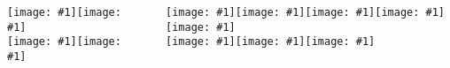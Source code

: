 \documentclass[final,table,14pt,aspectratio=141]{beamer}
\newcommand{\figheight}{.05\textheight}
\newcommand{\putlogo}[1]{\texttt{[image: \#1]}}
\newcommand{\putlogoB}[1]{\texttt{[image: \#1]}}
\begin{document}
\begin{frame}[fragile]
\begin{columns}[totalwidth=1.\textwidth,c]
\vspace{.1cm}

\putlogo{logo_gher}\hspace{.5cm}\putlogo{logo_ulg}\\ 
\putlogo{logo_imedea}\hspace{.5cm}\putlogo{logo_whoi}

~

\scriptsize
\putlogo{coq_wallon}\hspace{.5cm}\putlogo{logo_IOC}\hspace{.5cm}\putlogo{logoSocib}\hspace{.5cm}\putlogo{logo_CNES}\hspace{.5cm}\putlogo{logo_esa}\\
\putlogo{logo_nasa}\hspace{.5cm}\putlogo{logo_onr}\hspace{.5cm}\putlogo{logo_iugg}%

\end{columns}

\end{frame}
\end{document}
